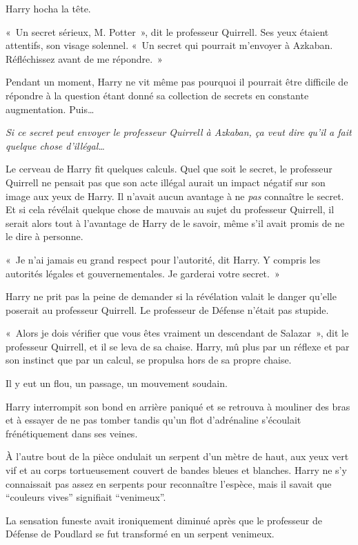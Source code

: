 Harry hocha la tête.

«~Un secret sérieux, M. Potter~», dit le professeur Quirrell. Ses yeux étaient attentifs, son visage solennel. «~Un secret qui pourrait m'envoyer à Azkaban. Réfléchissez avant de me répondre.~»

Pendant un moment, Harry ne vit même pas pourquoi il pourrait être difficile de répondre à la question étant donné sa collection de secrets en constante augmentation. Puis…

\emph{Si ce secret peut envoyer le professeur Quirrell à Azkaban, ça veut dire qu'il a fait quelque chose d'illégal…}

Le cerveau de Harry fit quelques calculs. Quel que soit le secret, le professeur Quirrell ne pensait pas que son acte illégal aurait un impact négatif sur son image aux yeux de Harry. Il n'avait aucun avantage à ne \emph{pas} connaître le secret. Et si cela révélait quelque chose de mauvais au sujet du professeur Quirrell, il serait alors tout à l'avantage de Harry de le savoir, même s'il avait promis de ne le dire à personne.

«~Je n'ai jamais eu grand respect pour l'autorité, dit Harry. Y compris les autorités légales et gouvernementales. Je garderai votre secret.~»

Harry ne prit pas la peine de demander si la révélation valait le danger qu'elle poserait au professeur Quirrell. Le professeur de Défense n'était pas stupide.

«~Alors je dois vérifier que vous êtes vraiment un descendant de Salazar~», dit le professeur Quirrell, et il se leva de sa chaise. Harry, mû plus par un réflexe et par son instinct que par un calcul, se propulsa hors de sa propre chaise.

Il y eut un flou, un passage, un mouvement soudain.

Harry interrompit son bond en arrière paniqué et se retrouva à mouliner des bras et à essayer de ne pas tomber tandis qu'un flot d'adrénaline s'écoulait frénétiquement dans ses veines.

À l'autre bout de la pièce ondulait un serpent d'un mètre de haut, aux yeux vert vif et au corps tortueusement couvert de bandes bleues et blanches. Harry ne s'y connaissait pas assez en serpents pour reconnaître l'espèce, mais il savait que “couleurs vives” signifiait “venimeux”.

La sensation funeste avait ironiquement diminué après que le professeur de Défense de Poudlard se fut transformé en un serpent venimeux.

